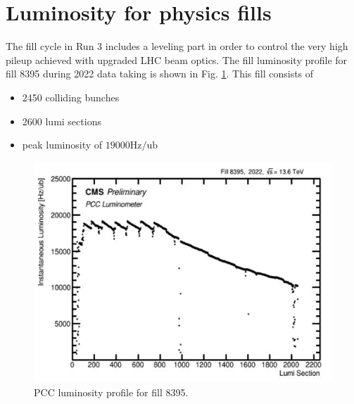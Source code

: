 \newpage
\section{Luminosity for physics fills}

The fill cycle in Run 3 includes a leveling part in order to control the very high pileup achieved with upgraded LHC beam optics. The fill luminosity profile for fill 8395 during 2022 data taking is shown in Fig. \ref{fig:period_bound_111}. This fill consists of

\begin{itemize}
  
\item 2450 colliding bunches

\item 2600 lumi sections

\item peak luminosity of $19000 \text{Hz} / \text{ub}$


\end{itemize}

\begin{figure}[H]
\centering
\includegraphics[width=1\textwidth]{ashish_thesis/Fill_profile_8274_1.png}
\caption[Fill 8274 luminosity profile]{%
  PCC luminosity profile for fill 8395.
}
\label{fig:period_bound_111}
\end{figure}

